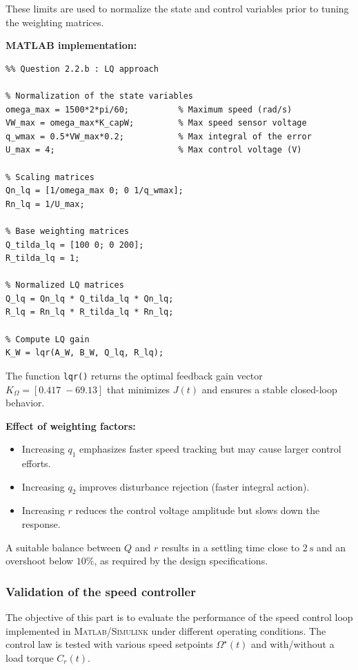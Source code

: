 \documentclass{rapportCS}
\begin{document}
These limits are used to normalize the state and control variables prior to tuning the weighting matrices.

\noindent\textbf{MATLAB implementation:}
\begin{verbatim}
%% Question 2.2.b : LQ approach

% Normalization of the state variables
omega_max = 1500*2*pi/60;          % Maximum speed (rad/s)
VW_max = omega_max*K_capW;         % Max speed sensor voltage
q_wmax = 0.5*VW_max*0.2;           % Max integral of the error
U_max = 4;                         % Max control voltage (V)

% Scaling matrices
Qn_lq = [1/omega_max 0; 0 1/q_wmax]; 
Rn_lq = 1/U_max;

% Base weighting matrices
Q_tilda_lq = [100 0; 0 200];
R_tilda_lq = 1;

% Normalized LQ matrices
Q_lq = Qn_lq * Q_tilda_lq * Qn_lq;
R_lq = Rn_lq * R_tilda_lq * Rn_lq;

% Compute LQ gain
K_W = lqr(A_W, B_W, Q_lq, R_lq);
\end{verbatim}

\noindent The function \texttt{lqr()} returns the optimal feedback gain vector
$K_\Omega = [0.417\; -69.13]$ that minimizes $J(t)$ and ensures
a stable closed-loop behavior.

\noindent\textbf{Effect of weighting factors:}
\begin{itemize}
    \item Increasing $q_1$ emphasizes faster speed tracking but may cause larger control efforts.
    \item Increasing $q_2$ improves disturbance rejection (faster integral action).
    \item Increasing $r$ reduces the control voltage amplitude but slows down the response.
\end{itemize}

A suitable balance between $Q$ and $r$ results in a settling time close to
$2~\mathrm{s}$ and an overshoot below $10\%$, as required by the design specifications.


\subsubsection{Validation of the speed controller}

The objective of this part is to evaluate the performance of the speed control loop implemented in \textsc{Matlab/Simulink} under different operating conditions.  
The control law is tested with various speed setpoints $\Omega^\star(t)$ and with/without a load torque $C_r(t)$.
\end{document}
